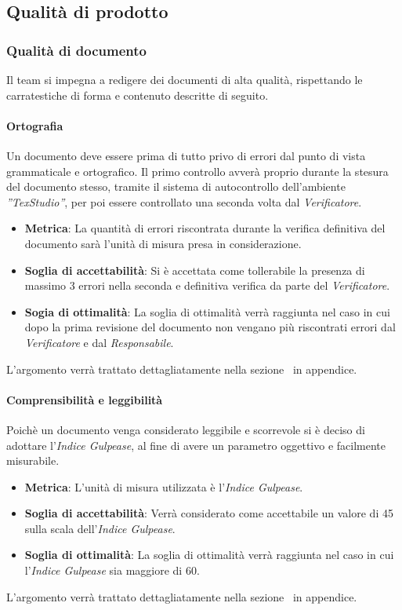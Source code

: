 \subsection{Qualità di prodotto}
\subsubsection{Qualità di documento}
Il team si impegna a redigere dei documenti di alta qualità, rispettando le carratestiche di forma e contenuto descritte di seguito.
\paragraph{Ortografia}
Un documento deve essere prima di tutto privo di errori dal punto di vista grammaticale e ortografico. 
Il primo controllo avverà proprio durante la stesura del documento stesso, tramite il sistema di autocontrollo dell'ambiente  \emph{''TexStudio''}, per poi essere controllato una seconda volta dal  \emph{Verificatore}.
\begin{itemize}
	\item \textbf{Metrica}: La quantità di errori riscontrata durante la verifica definitiva del documento sarà l'unità di misura presa in considerazione.
	\item \textbf{Soglia di accettabilità}: Si è accettata come tollerabile la presenza di massimo 3 errori nella seconda e definitiva verifica da parte del \emph{Verificatore}.
	\item \textbf{Sogia di ottimalità}: La soglia di ottimalità verrà raggiunta nel caso in cui dopo la prima revisione del documento non vengano più riscontrati errori dal \emph{Verificatore} e dal \emph{Responsabile}.
\end{itemize}
L'argomento verrà trattato dettagliatamente nella sezione~ in appendice.

\paragraph{Comprensibilità e leggibilità}
Poichè un documento venga considerato leggibile e scorrevole si è deciso di adottare l'\emph{Indice Gulpease}, al fine di avere un parametro oggettivo e facilmente misurabile.
\begin{itemize}
	\item \textbf{Metrica}: L'unità di misura utilizzata è l'\emph{Indice Gulpease}.
	\item \textbf{Soglia di accettabilità}: Verrà considerato come accettabile un valore di 45 sulla scala dell'\emph{Indice Gulpease}.
	\item \textbf{Soglia di ottimalità}: La soglia di ottimalità verrà raggiunta nel caso in cui l'\emph{Indice Gulpease} sia maggiore di 60.
\end{itemize}
L'argomento verrà trattato dettagliatamente nella sezione~ in appendice.

